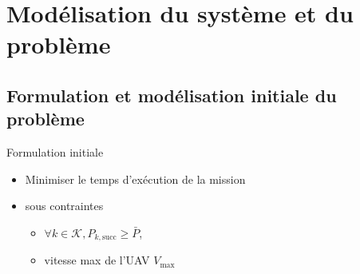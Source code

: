\section{Modélisation du système et du problème}

\subsection[Modèle initial]{Formulation et modélisation initiale du
problème}
\begin{frame}{Formulation initiale}
  \begin{itemize}
  \item Minimiser le temps d'exécution de la mission
  \item sous contraintes
    \begin{itemize}
    \item \( \forall k \in \mathcal{K}, P_{k, \text{succ}} \geq
      \bar{P} \),
    \item vitesse max de l'UAV \( V_{\text{max}} \)
    \end{itemize}
  \end{itemize}
\end{frame}



